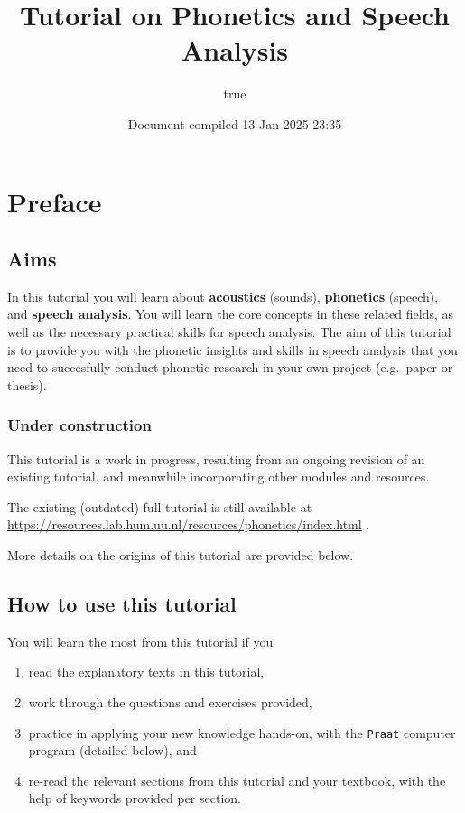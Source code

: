 \documentclass[
]{book}
\title{Tutorial on Phonetics and Speech Analysis}
\author{true}
\date{Document compiled 13 Jan 2025 23:35}
\providecommand{\tightlist}{%
  \setlength{\itemsep}{0pt}\setlength{\parskip}{0pt}}
\begin{document}
\maketitle

{
\setcounter{tocdepth}{1}
\tableofcontents
}
\chapter*{Preface}\label{preface}

\section*{Aims}\label{aims}

In this tutorial you will learn about \textbf{acoustics} (sounds), \textbf{phonetics} (speech), and \textbf{speech analysis}.
You will learn the core concepts in these related fields, as well as the necessary practical skills for speech analysis.
The aim of this tutorial is to provide you with the phonetic insights and skills in speech analysis that you need to succesfully conduct phonetic research in your own project (e.g.~paper or thesis).

\subsection*{Under construction}\label{under-construction}

This tutorial is a work in progress, resulting from an ongoing revision of an existing tutorial, and meanwhile incorporating other modules and resources.

The existing (outdated) full tutorial is still available at \url{https://resources.lab.hum.uu.nl/resources/phonetics/index.html}
.

More details on the origins of this tutorial are provided below.

\section*{How to use this tutorial}\label{how-to-use-this-tutorial}

You will learn the most from this tutorial if you

\begin{enumerate}
\def\labelenumi{(\arabic{enumi})}
\tightlist
\item
  read the explanatory texts in this tutorial,
\item
  work through the questions and exercises provided,
\item
  practice in applying your new knowledge hands-on, with the \texttt{Praat} computer program (detailed below), and
\item
  re-read the relevant sections from this tutorial and your textbook, with the help of keywords provided per section.
\end{enumerate}
\end{document}
